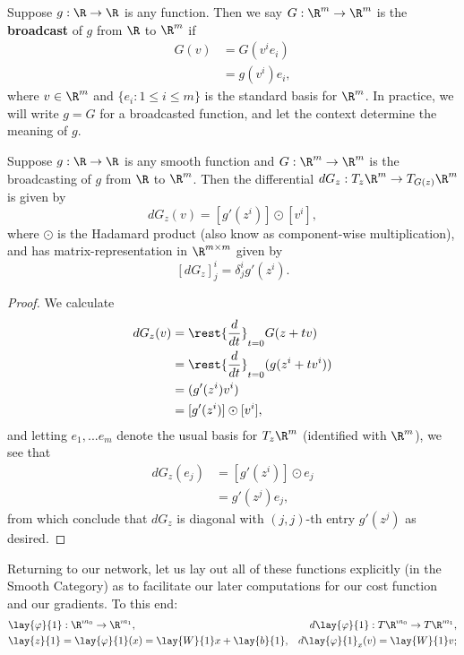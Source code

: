 \begin{defn}
	Suppose $g:\R\to\R$ is any function.  Then we say $G:\R^{m}\to\R^{m}$ is the \textbf{broadcast} of $g$ from $\R$ to $\R^m$ if
	\begin{align*}
		G(v)&=G(v^ie_i)\\
		&=g(v^i)e_i,
	\end{align*}
	where $v\in\R^{m}$ and $\{e_i:1\leq i\leq m\}$ is the standard basis for $\R^{m}$.  In practice, we will write $g=G$ for a broadcasted function, and let the context determine the meaning of $g$.
\end{defn}

\begin{lem}\label{lem: broadcastingDifferential}
	Suppose $g:\R\to\R$ is any smooth function and $G:\R^m\to\R^m$ is the broadcasting of $g$ from $\R$ to $\R^m$.  Then the differential $dG_z:T_z\R^m\to T_{G(z)}\R^m$ is given by
	$$dG_z(v)=[g'(z^i)]\odot [v^i],$$
	where $\odot$ is the Hadamard product (also know as component-wise multiplication), and has matrix-representation in $\R^{m\times m}$ given by
	$$[dG_z]^i_j =\delta^i_j g'(z^i).$$
\end{lem}

\begin{proof}
	We calculate
	\begin{align*}
		dG_z(v)&=\rest{\frac{d}{dt}}_{t=0}G(z+tv)\\
		&=\rest{\frac{d}{dt}}_{t=0}(g(z^i+tv^i))\\
		&=(g'(z^i)v^i)\\
		&=[g'(z^i)]\odot[v^i],
	\end{align*}
	and letting $e_1,...e_m$ denote the usual basis for $T_z\R^m$ (identified with $\R^m$), we see that
	\begin{align*}
		dG_z(e_j)&=[g'(z^i)]\odot e_j\\
		&=g'(z^j)e_j,
	\end{align*}
	from which conclude that $dG_z$ is diagonal with $(j,j)$-th entry $g'(z^j)$ as desired.
\end{proof}

Returning to our network, let us lay out all of these functions explicitly (in the Smooth Category) as to facilitate our later computations for our cost function and our gradients.
To this end:
\begin{align*}
	&\lay{\varphi}{1}:\R^{m_0}\to\R^{m_1},\qquad &d\lay{\varphi}{1}:T\R^{m_0}\to T\R^{m_1},\\
	&\lay{z}{1}=\lay{\varphi}{1}(x)=\lay{W}{1}x+\lay{b}{1},&d\lay{\varphi}{1}_x(v)=\lay{W}{1}v;
\end{align*}


